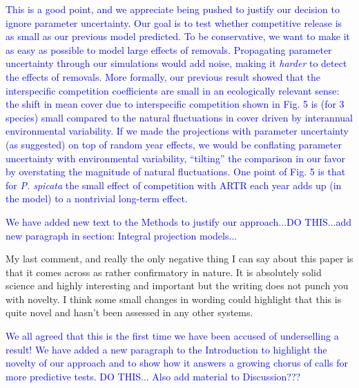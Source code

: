 \documentclass[12pt]{article}
\newcommand{\response}{\textcolor{blue}}
\begin{document}
\response{ This is a good point, and we appreciate being pushed to justify our decision to ignore parameter uncertainty. Our goal is to test
whether competitive release is as small as our previous model predicted. To be conservative, we want to make it as easy as possible to
model large effects of removals.  Propagating parameter uncertainty through our simulations would add noise, making it \emph{harder} to 
detect the effects of removals. More formally, our previous result showed that the interspecific competition coefficients are small in an ecologically
relevant sense: the shift in mean cover due to interspecific competition shown in Fig. 5 is (for 3 species) small compared to the natural fluctuations in cover driven by interannual environmental variability. 
If we made the projections with parameter uncertainty (as suggested) on top of random year effects, we would be conflating parameter uncertainty with environmental variability, ``tilting'' the
comparison in our favor by overstating the magnitude of natural fluctuations. One point of Fig. 5 is that for \emph{P. spicata} the small effect of competition with ARTR each year adds up (in the model) to a nontrivial long-term effect.

We have added new text to the Methods to justify our approach...DO THIS...add new paragraph in section: Integral projection models...
  }

 
My last comment, and really the only negative thing I can say about this paper is that it comes across as rather confirmatory in nature. It is absolutely solid science and 
highly interesting and important but the writing does not punch you with novelty. I think some small changes in wording could highlight that this is quite novel and hasn't 
been assessed in any other systems. 

\response{We all agreed that this is the first time we have been accused of underselling a result! We have added a new paragraph to the Introduction
to highlight the novelty of our approach and to show how it answers a growing chorus of calls for more predictive tests. DO THIS...
Also add material to Discussion???}
\end{document}
